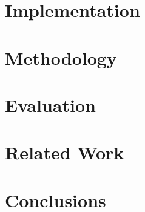 \documentclass[format=acmsmall, review=false, screen=true]{acmart}
\begin{document}
\section{Implementation}
\label{sec:implementation}



\section{Methodology}
\label{sec:methodology}



\section{Evaluation}
\label{sec:evaluation}



\section{Related Work}
\label{sec:related_work}



\section{Conclusions}
\label{sec:conclusions}





\end{document}
